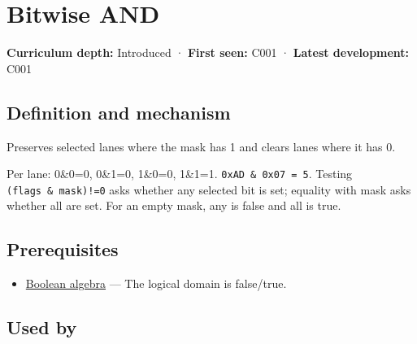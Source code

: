 \hypertarget{appendix-68b52453737c}{}\label{referencestart:appendix-68b52453737c}
\section{Bitwise AND}\label{appendix-68b52453737c-bitwise-and}

\hypertarget{appendix-68b52453737c-bitwise-and}{}

\textbf{Curriculum depth:} Introduced · \textbf{First seen:} C001 · \textbf{Latest development:} C001

\begin{allmightroledefinition}

\subsection{Definition and mechanism}\label{appendix-68b52453737c-definition-and-mechanism}

\hypertarget{appendix-68b52453737c-definition-and-mechanism}{}

Preserves selected lanes where the mask has 1 and clears lanes where it has 0.

\end{allmightroledefinition}

Per lane: 0\&0=0, 0\&1=0, 1\&0=0, 1\&1=1. \texttt{0xAD\ \&\ 0x07\ =\ 5}. Testing \texttt{(flags\ \&\ mask)!=0} asks whether any selected bit is set; equality with mask asks whether all are set. For an empty mask, any is false and all is true.

\subsection{Prerequisites}\label{appendix-68b52453737c-prerequisites}

\hypertarget{appendix-68b52453737c-prerequisites}{}

\begin{itemize}
\tightlist
\item
  \hyperref[appendix-24475e1596a8]{Boolean algebra} --- The logical domain is false/true.
\end{itemize}

\subsection{Used by}\label{appendix-68b52453737c-used-by}

\hypertarget{appendix-68b52453737c-used-by}{}

